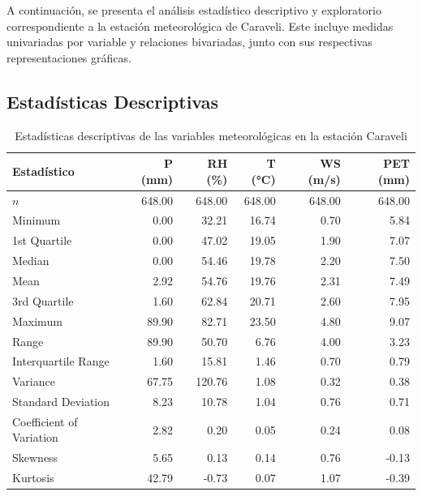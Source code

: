 A continuación, se presenta el análisis estadístico descriptivo y exploratorio correspondiente a la estación meteorológica de Caraveli. Este incluye medidas univariadas por variable y relaciones bivariadas, junto con sus respectivas representaciones gráficas.

\subsection{Estadísticas Descriptivas}

\begin{table}[htbp]
\centering
\caption{Estadísticas descriptivas de las variables meteorológicas en la estación Caraveli}
\label{tab:stat_caraveli}
\scriptsize
\begin{tabular}{lrrrrr}
\toprule
\textbf{Estadístico} & \textbf{P (mm)} & \textbf{RH (\%)} & \textbf{T (°C)} & \textbf{WS (m/s)} & \textbf{PET (mm)} \\
\midrule
$n$    & 648.00 & 648.00 & 648.00 & 648.00 & 648.00 \\
Minimum                 & 0.00   & 32.21  & 16.74  & 0.70   & 5.84   \\
1st Quartile          & 0.00   & 47.02  & 19.05  & 1.90   & 7.07   \\
Median               & 0.00   & 54.46  & 19.78  & 2.20   & 7.50   \\
Mean                 & 2.92   & 54.76  & 19.76  & 2.31   & 7.49   \\
3rd Quartile           & 1.60   & 62.84  & 20.71  & 2.60   & 7.95   \\
Maximum                & 89.90  & 82.71  & 23.50  & 4.80   & 9.07   \\
Range                 & 89.90  & 50.70  & 6.76   & 4.00   & 3.23   \\
Interquartile Range  & 1.60   & 15.81  & 1.46   & 0.70   & 0.79   \\
Variance            & 67.75  & 120.76 & 1.08   & 0.32   & 0.38   \\
Standard Deviation          & 8.23   & 10.78  & 1.04   & 0.76   & 0.71   \\
Coefficient of Variation      & 2.82   & 0.20   & 0.05   & 0.24   & 0.08   \\
Skewness            & 5.65   & 0.13   & 0.14   & 0.76   & -0.13  \\
Kurtosis              & 42.79  & -0.73  & 0.07   & 1.07   & -0.39  \\
\bottomrule
\end{tabular}
\end{table}

